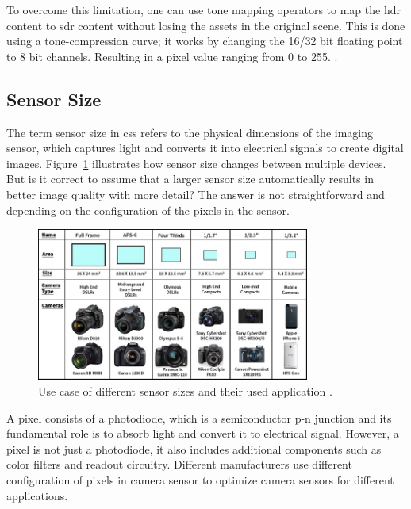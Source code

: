 To overcome this limitation, one can use tone mapping operators to map the \gls{hdr} content to \gls{sdr} content without losing the assets in the original scene. This is done using a tone-compression curve; it works by changing the 16/32 bit floating point to 8 bit channels. Resulting in a pixel value ranging from 0 to 255. \cite{HDR}.

\subsection{Sensor Size}
The term sensor size in \gls{cs}s refers to the physical dimensions of the imaging sensor, which captures light and converts it into electrical signals to create digital images. Figure~\ref{Sen_Size_chart} illustrates how sensor size changes between multiple devices. But is it correct to assume that a larger sensor size automatically results in better image quality with more detail? The answer is not straightforward and depending on the configuration of the pixels in the sensor. 

\begin{figure}[ht]
    \centering
    \includegraphics[width=0.8\textwidth]{Figures/sensor-chart.jpg}  
    \caption{Use case of different sensor sizes and their used application \cite{Sen_size_chart}.}
    \label{Sen_Size_chart}
\end{figure}

A pixel consists of a photodiode, which is a semiconductor p-n junction and its fundamental role is to absorb light and convert it to electrical signal.  However, a pixel is not just a photodiode, it also includes additional components such as color filters and readout circuitry. Different manufacturers use different configuration of pixels in camera sensor to optimize camera sensors for different applications.

